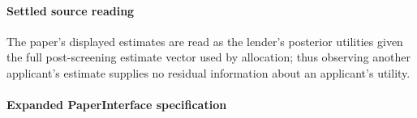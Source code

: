 \documentclass[10pt]{article}
\begin{document}
\paragraph{Settled source reading}
\begin{sloppypar}
The paper's displayed estimates are read as the lender's posterior utilities given the full post-\allowbreak{}screening estimate vector used by allocation;\allowbreak{} thus observing another applicant's estimate supplies no residual information about an applicant's utility.\allowbreak{}
\end{sloppypar}

\paragraph{Expanded PaperInterface specification}
\end{document}
